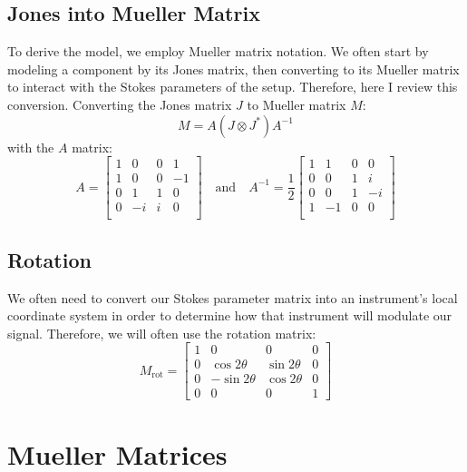 \subsection{Jones into Mueller Matrix}
To derive the model, we employ Mueller matrix notation.  We often start by modeling a component by its Jones matrix, then converting to its Mueller matrix to interact with the Stokes parameters of the setup. Therefore, here I review this conversion.  Converting the Jones matrix $J$ to Mueller matrix $M$:
\begin{equation}
    M = A(J\otimes J^*)A^{-1}
\end{equation}
with the $A$ matrix:
\begin{equation}
    A = \begin{bmatrix}
    1 & 0 & 0 & 1\\
    1 & 0 & 0 & -1\\
    0 & 1 & 1 & 0\\
    0 & -i & i & 0\\
  \end{bmatrix}\quad\text{and}\quad 
     A^{-1} = \frac{1}{2}\begin{bmatrix}
    1 & 1 & 0 & 0\\
    0 & 0 & 1 & i\\
    0 & 0 & 1 & -i\\
    1 & -1 & 0 & 0\\
  \end{bmatrix}
\end{equation}
\subsection{Rotation}
We often need to convert our Stokes parameter matrix into an instrument's local coordinate system in order to determine how that instrument will modulate our signal.  Therefore, we will often use the rotation matrix:
\begin{equation}
   M_{\text{rot}}= \begin{bmatrix}
    1 & 0 & 0 & 0 \\
    0 & \cos{2\theta} & \sin{2\theta} & 0 \\
    0 & -\sin{2\theta} & \cos{2\theta} & 0  \\
    0 & 0 & 0 & 1
    \end{bmatrix}
\end{equation}
\section{Mueller Matrices}

